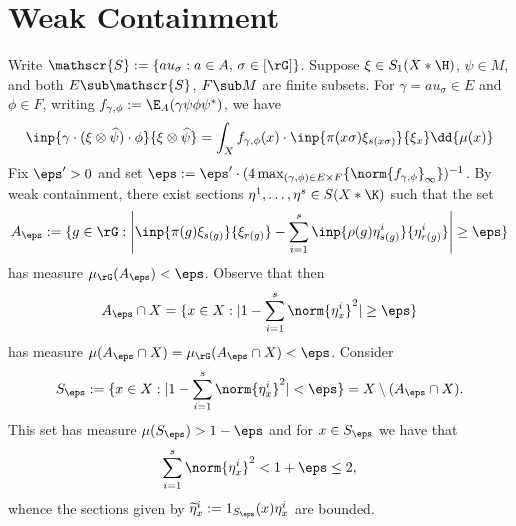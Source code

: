 \documentclass[../main.tex]{subfiles}
\begin{document}
\section{Weak Containment}
   Write $ \mathscr{S}:= \{au_{\sigma}: a\in A,\, \sigma\in[\rG]\} $.
    Suppose $ \xi\in S_{1}(X\ast\H) $, $ \psi\in M $, and both $ E\sub \mathscr{S} $, $ F\sub M $ are finite subsets. For $ \gamma = au_{\sigma}\in E $ and $ \phi\in F $, writing $ f_{\gamma,\phi}:= \E_{A}(\gamma \psi \phi \psi^{*}) $, we have
    \begin{align*}
        \inp{\gamma\cdot (\xi \otimes \widehat{\psi})\cdot \phi}{\xi \otimes \widehat{\psi}} = \int_{X}f_{\gamma,\phi}(x)\cdot \inp{\pi(x \sigma) \xi_{s(x \sigma)}}{\xi_{x}}\dd{\mu(x)}
    \end{align*}
    Fix $ \eps^{\prime}>0 $ and set $ \eps:= \eps^{\prime}\cdot(4\max_{(\gamma,\phi)\in E\times F}\{\norm{f_{\gamma,\phi}}_{\infty}\})^{-1} $. By weak containment, there exist sections $ \eta^{1},\ldots, \eta^{s}\in S(X\ast\K) $ such that the set
    \[
        A_{\eps} := \{g\in \rG:\left|\inp{\pi(g) \xi_{s(g)}}{\xi_{r(g)}} - \sum_{i=1}^{s} \inp{\rho(g) \eta^{i}_{s(g)}}{\eta^{i}_{r(g)}} \right| \geq \eps\}
    \]
    has measure $ \mu_{\rG}(A_{\eps}) < \eps $. Observe that then
    \[
        A_{\eps}\cap X = \{x\in X: |1 - \sum_{i=1}^{s}\norm{\eta^{i}_{x}}^{2}|\geq \eps\}
    \]
    has measure $ \mu(A_{\eps}\cap X) = \mu_{\rG}(A_{\eps}\cap X) < \eps $. Consider
    \[
        S_{\eps} := \{x\in X: |1-\sum_{i=1}^{s} \norm{\eta^{i}_{x}}^{2}|< \eps\} = X\setminus (A_{\eps}\cap X).
    \]
    This set has measure $ \mu(S_{\eps}) > 1-\eps $ and for $ x\in S_{\eps} $ we have that 
    \[
        \sum_{i=1}^{s}\norm{\eta^{i}_{x}}^{2}< 1+\eps \leq 2,
    \]
    whence the sections given by $ \widetilde{\eta}^{i}_{x}:= 1_{S_{\eps}}(x) \eta^{i}_{x} $ are bounded.\\
\end{document}

